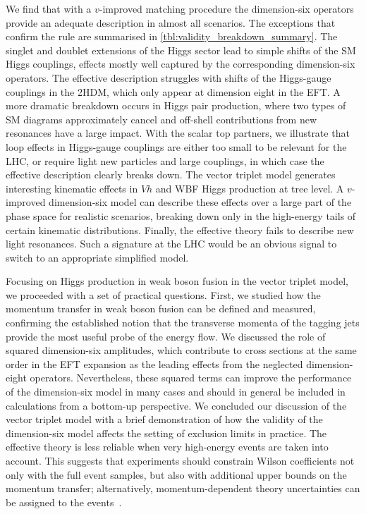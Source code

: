 We find that with a $v$-improved matching procedure the dimension-six
operators provide an adequate description in almost all scenarios. The
exceptions that confirm the rule are summarised in
\autoref{tbl:validity_breakdown_summary}. The singlet and doublet
extensions of the Higgs sector lead to simple shifts of the SM Higgs
couplings, effects mostly well captured by the corresponding
dimension-six operators. The effective description struggles with
shifts of the Higgs-gauge couplings in the 2HDM, which only appear at
dimension eight in the EFT. A more dramatic breakdown occurs in Higgs
pair production, where two types of SM diagrams approximately cancel
and off-shell contributions from new resonances have a large impact.
With the scalar top partners, we illustrate that loop effects in
Higgs-gauge couplings are either too small to be relevant for the LHC,
or require light new particles and large couplings, in which case the
effective description clearly breaks down. The vector triplet model
generates interesting kinematic effects in $Vh$ and WBF Higgs
production at tree level. A $v$-improved dimension-six model can
describe these effects over a large part of the phase space for
realistic scenarios, breaking down only in the high-energy tails of
certain kinematic distributions. Finally, the effective theory fails
to describe new light resonances. Such a signature at the LHC would be
an obvious signal to switch to an appropriate simplified model.

Focusing on Higgs production in weak boson fusion in the vector
triplet model, we proceeded with a set of practical questions. First,
we studied how the momentum transfer in weak boson fusion can be
defined and measured, confirming the established notion that the
transverse momenta of the tagging jets provide the most useful probe
of the energy flow. We discussed the role of squared dimension-six
amplitudes, which contribute to cross sections at the same order in
the EFT expansion as the leading effects from the neglected
dimension-eight operators. Nevertheless, these squared terms can
improve the performance of the dimension-six model in many cases and
should in general be included in calculations from a bottom-up
perspective. We concluded our discussion of the vector triplet model
with a brief demonstration of how the validity of the dimension-six
model affects the setting of exclusion limits in practice. The
effective theory is less reliable when very high-energy events are
taken into account. This suggests that experiments should constrain
Wilson coefficients not only with the full event samples, but also
with additional upper bounds on the momentum transfer; alternatively,
momentum-dependent theory uncertainties can be assigned to the
events~\cite{Berthier:2016bke}.

